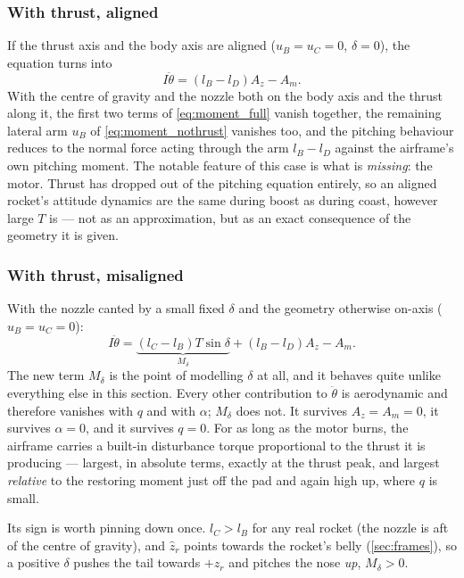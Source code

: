 \subsubsection{With thrust, aligned}\label{sec:analysis_aligned}
If the thrust axis and the body axis are aligned ($u_B=u_C=0$, $\delta=0$), the equation turns
into
\begin{equation} \label{eq:moment_aligned}
    I\ddot{\theta} = (l_B - l_D)A_z - A_m.
\end{equation}
With the centre of gravity and the nozzle both on the body axis and the thrust along it, the first
two terms of \autoref{eq:moment_full} vanish together, the remaining lateral arm $u_B$ of
\autoref{eq:moment_nothrust} vanishes too, and the pitching behaviour reduces to the normal force
acting through the arm $l_B-l_D$ against the airframe's own pitching moment. The notable feature
of this case is what is \emph{missing}: the motor. Thrust has dropped out of the pitching equation
entirely, so an aligned rocket's attitude dynamics are the same during boost as during coast,
however large $T$ is --- not as an approximation, but as an exact consequence of the geometry it
is given.

\subsubsection{With thrust, misaligned}\label{sec:analysis_misaligned}
With the nozzle canted by a small fixed $\delta$ and the geometry otherwise on-axis
($u_B=u_C=0$):
\begin{equation} \label{eq:moment_misaligned}
    I\ddot{\theta} = \underbrace{(l_C - l_B)T\sin\delta}_{M_\delta} + (l_B - l_D)A_z - A_m.
\end{equation}
The new term $M_\delta$ is the point of modelling $\delta$ at all, and it behaves quite unlike
everything else in this section. Every other contribution to $\ddot{\theta}$ is aerodynamic and
therefore vanishes with $q$ and with $\alpha$; $M_\delta$ does not. It survives $A_z=A_m=0$, it
survives $\alpha=0$, and it survives $q=0$. For as long as the motor burns, the airframe carries a
built-in disturbance torque proportional to the thrust it is producing --- largest, in absolute
terms, exactly at the thrust peak, and largest \emph{relative} to the restoring moment just off
the pad and again high up, where $q$ is small.

Its sign is worth pinning down once. $l_C>l_B$ for any real rocket (the nozzle is aft of the
centre of gravity), and $\hat{z}_r$ points towards the rocket's belly (\autoref{sec:frames}), so a
positive $\delta$ pushes the tail towards $+\hat{z}_r$ and pitches the nose \emph{up}, $M_\delta>0$.

